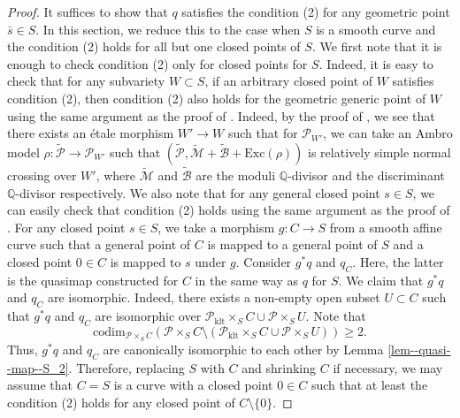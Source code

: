 \documentclass[10pt,a4paper]{amsart}
\begin{document}
\begin{proof}
 It suffices to show that $q$ satisfies the condition (2) for any geometric point $\bar{s}\in S$.
 In this section, we reduce this to the case when $S$ is a smooth curve and the condition (2) holds for all but one closed points of $S$.
We first note that it is enough to check condition (2) only for closed points for $S$.
Indeed, it is easy to check that for any subvariety $W\subset S$, if an arbitrary closed point of $W$ satisfies condition (2), then condition (2) also holds for the geometric generic point of $W$ using the same argument as the proof of \cite[Lemma 4.1]{HH}. 
Indeed, by the proof of \cite[Lemma 4.1]{HH}, we see that there exists an \'etale morphism $W'\to W$ such that for  $\mathcal{P}_{W'}$, we can take an Ambro model $\rho\colon\widetilde{\mathcal{P}}\to \mathcal{P}_{W'}$ such that $(\widetilde{\mathcal{P}},\widetilde{\mathcal{M}}+\widetilde{\mathcal{B}}+\mathrm{Exc}(\rho))$ is relatively simple normal crossing over $W'$, where $\widetilde{\mathcal{M}}$ and $\widetilde{\mathcal{B}}$ are the moduli $\mathbb{Q}$-divisor and the discriminant $\mathbb{Q}$-divisor respectively.
We also note that for any general closed point $s\in S$, we can easily check that condition (2) holds using the same argument as the proof of \cite[Lemma 4.1]{HH}.
For any closed point $s\in S$,  we take a morphism $g\colon C\to S$ from a smooth affine curve such that a general point of $C$ is mapped to a general point of $S$ and a closed point $0\in C$ is mapped to $s$ under $g$.
Consider $g^*q$ and $q_C$.
Here, the latter is the quasimap constructed for $C$ in the same way as $q$ for $S$.
We claim that $g^*q$ and $q_C$ are isomorphic.
Indeed, there exists a non-empty open subset $U\subset C$ such that $g^*q$ and $q_C$ are isomorphic over $\mathcal{P}_{\mathrm{klt}}\times_SC\cup \mathcal{P}\times_SU$.
Note that $$\mathrm{codim}_{\mathcal{P}\times_SC}(\mathcal{P}\times_SC\setminus(\mathcal{P}_{\mathrm{klt}}\times_SC\cup \mathcal{P}\times_SU))\ge2.$$ 
Thus, $g^*q$ and $q_C$ are canonically isomorphic to each other by Lemma \ref{lem--quasi--map--S_2}.
Therefore, replacing $S$ with $C$ and shrinking $C$ if necessary, we may assume that $C=S$ is a curve with a closed point $0\in C$ such that at least the condition (2) holds for any closed point of $C\setminus\{0\}$.


\end{proof}
\end{document}
